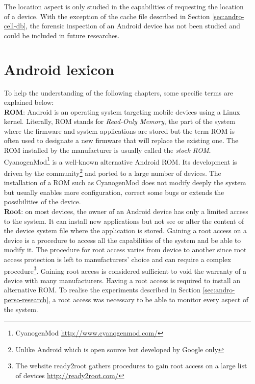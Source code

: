 The location aspect is only studied in the capabilities of requesting the location of a device.
With the exception of the cache file described in Section \ref{sec:andro-cell-db}, the forensic inspection of an Android device has not been studied and could be included in future researches.

\section*{Android lexicon}
\label{sec:android-lexicon}

To help the understanding of the following chapters, some specific terms are explained below:\\

\textbf{ROM}: Android is an operating system targeting mobile devices using a Linux kernel.
Literally, ROM stands for \emph{Read-Only Memory}, the part of the system where the firmware and system applications are stored but the term ROM is often used to designate a new firmware that will replace the existing one.
The ROM installed by the manufacturer is usually called the \emph{stock ROM}.
CyanogenMod\footnote{CyanogenMod \url{http://www.cyanogenmod.com/}} is a well-known alternative Android ROM.
Its development is driven by the community\footnote{Unlike Android which is open source but developed by Google only} and ported to a large number of devices.
The installation of a ROM such as CyanogenMod does not modify deeply the system but usually enables more configuration, correct some bugs or extends the possibilities of the device.\\

\textbf{Root}: on most devices, the owner of an Android device has only a limited access to the system.
It can install new applications but not see or alter the content of the device system file where the application is stored.
Gaining a root access on a device is a procedure to access all the capabilities of the system and be able to modify it.
The procedure for root access varies from device to another since root access protection is left to manufacturers' choice and can require a complex procedure\footnote{The website ready2root gathers procedures to gain root access on a large list of devices \url{http://ready2root.com/}}.
Gaining root access is considered sufficient to void the warranty of a device with many manufacturers.
Having a root access is required to install an alternative ROM.
To realise the experiments described in Section \ref{sec:andro-perso-research}, a root access was necessary to be able to monitor every aspect of the system.

